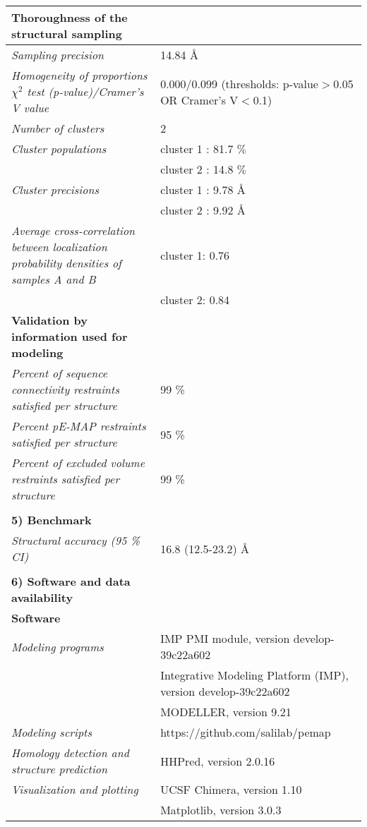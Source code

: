 \documentclass[8pt,a4paper]{article}
\begin{document}
\begin{longtable}{ p{} | p{} }
    \textbf{Thoroughness of the structural sampling} & \\
    \hline
          \textit{Sampling precision} & 14.84 \AA \\
                \textit{Homogeneity of proportions $\chi^2$ test (p-value)/Cramer’s V value} & 0.000/0.099 (thresholds: p-value$>$0.05 OR Cramer's V$<$0.1)\\
                \textit{Number of clusters} & 2\\
                \textit{Cluster populations} & cluster 1 : 81.7 $\%$\\
            & cluster 2 : 14.8 $\%$ \\
                \textit{Cluster precisions} & cluster 1 : 9.78 \AA\\
            & cluster 2 : 9.92 \AA \\
                \textit{Average cross-correlation between localization probability densities of samples A and B} & cluster 1: 0.76\\
            & cluster 2: 0.84 \\
           \hline
  
  \textbf{Validation by information used for modeling} & \\
  \hline
          \textit{Percent of sequence connectivity restraints satisfied per structure} & 99 \%\\
                \textit{Percent pE-MAP restraints satisfied per structure} & 95 \%\\
                \textit{Percent of excluded volume restraints satisfied per structure} & 99 \%\\
          &  \\
  
  \textbf{5) Benchmark} & \\
  \hline
          \textit{Structural accuracy (95 \% CI)} & 16.8 (12.5-23.2) \AA\\
          
   &  \\
  \normalsize{\textbf{6) Software and data availability}} & \\
    \hline
   \textbf{Software} & \\
   \hline
             \textit{Modeling programs} & IMP PMI module, version develop-39c22a602\\
             & Integrative Modeling Platform (IMP), version develop-39c22a602 \\
             & MODELLER, version 9.21 \\
                  \textit{Modeling scripts} & https://github.com/salilab/pemap\\
                  \textit{Homology detection and structure prediction} & HHPred, version 2.0.16\\
                  \textit{Visualization and plotting} & UCSF Chimera, version 1.10\\
             & Matplotlib, version 3.0.3  \\
          \hline


\end{longtable}
\end{document}
